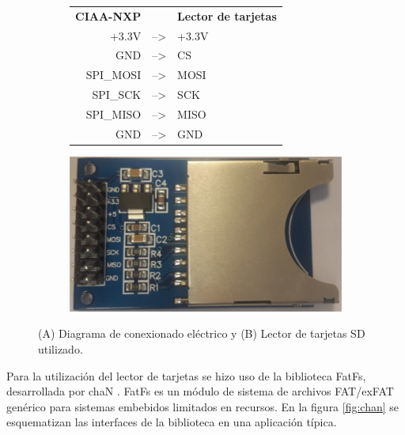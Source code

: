 \begin{figure}[h]
	\centering
	\begin{subfigure}{.5\textwidth}
		\centering
		\begin{tabular}{rll}
			\textbf{CIAA-NXP }&	& \textbf{Lector de tarjetas}\\
			+3.3V     & --\textgreater{} & +3.3V   \\
			GND       & --\textgreater{} & CS  \\
			SPI\_MOSI & --\textgreater{} & MOSI  \\
			SPI\_SCK  & --\textgreater{} & SCK \\
			SPI\_MISO & --\textgreater{} & MISO  \\
			GND       & --\textgreater{} & GND  \\
		\end{tabular}
		\caption{ }
  		\label{fig:lector_conexionado}
	\end{subfigure}%
	\begin{subfigure}{.5\textwidth}
		\centering
		\includegraphics[width=.9\textwidth]{./Figures/sdCardReader.jpg}
		\caption{ }
		\label{fig:lector_hardware}
	\end{subfigure}
	\caption{(A) Diagrama de conexionado eléctrico y (B) Lector de tarjetas SD utilizado.}
	\label{fig:lector_sdCard}
\end{figure}

\vspace{10px}

Para la utilización del lector de tarjetas se hizo uso de la biblioteca FatFs, desarrollada por chaN \citep{fatFS}. FatFs es un módulo de sistema de archivos FAT/exFAT genérico para sistemas embebidos limitados en recursos. En la figura \ref{fig:chan} se esquematizan las interfaces de la biblioteca en una aplicación típica. 

